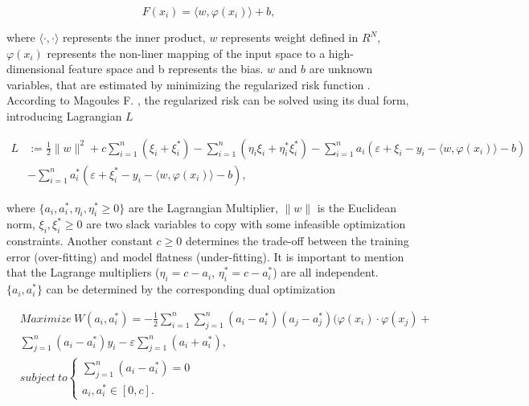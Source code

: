 \begin{equation}
   F(x_i) = \langle w, \varphi(x_i) \rangle + b,
   \label{svmdec}
\end{equation}

where $\langle\cdot,\cdot\rangle$ represents the inner product, $w$ represents weight defined in $R^N$, $\varphi(x_i)$ represents the non-liner mapping of the input space to a high-dimensional feature space and b represents the bias\cite{svm2}. $w$ and $b$ are unknown variables, that are estimated by minimizing the regularized risk function \cite{svm2}. According to Magoules F. \cite{ann1}, the regularized risk can be solved using its dual form, introducing Lagrangian $L$

\begin{equation}
\begin{split}
       L & := \frac{1}{2}\parallel w \parallel^2 + c \sum_{i=1}^{n}(\xi_i + \xi_i^*) - \sum_{i=1}^{n}(\eta_i\xi_i + \eta_i^*\xi_i^*) - \sum_{i=1}^{n}a_i(\varepsilon + \xi_i - y_i- \langle w, \varphi(x_i) \rangle - b) \\ 
         & - \sum_{i=1}^{n}a_i^*(\varepsilon + \xi_i^* - y_i- \langle w, \varphi(x_i) \rangle - b),
\end{split}
\end{equation}

where $\{a_i, a_i^*, \eta_i, \eta_i^*\geq 0\}$ are the Lagrangian Multiplier, $\parallel w \parallel$ is the Euclidean norm, ${{\xi_i,\xi_i^*\geq 0}}$ are two slack variables to copy with some infeasible optimization constraints\cite{review2017}. Another constant $c \geq 0$ determines the trade-off between the training error (over-fitting) and model flatness (under-fitting)\cite{review2017}. 
It is important to mention that the Lagrange multipliers ($\eta_i = c - a_i$, $\eta_i^* = c-a_i^*$) are all independent. $\{a_i, a_i^*\}$ can be determined by the corresponding dual optimization \cite{ann1}

\begin{equation}
\begin{split}
       & Maximize \  W(a_i, a_i^*) = -\frac{1}{2}\sum_{i=1}^{n}\sum_{j=1}^{n}(a_i-a_i^*)(a_j-a_j^*)(\varphi(x_i)\cdot \varphi(x_j) + \\
       & \sum_{j=1}^{n}(a_i-a_i^*)y_i - \varepsilon \sum_{j=1}^{n}(a_i+a_i^*),\\
       & subject \  to \begin{cases} \sum_{j=1}^{n}(a_i-a_i^*) = 0 \\ a_i, a_i^* \in [0,c]. \end{cases} 
\end{split}
\end{equation}


